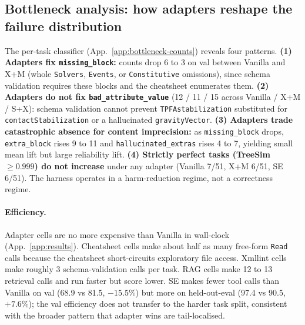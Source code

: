 \documentclass{article}
\begin{document}
\subsection{Bottleneck analysis: how adapters reshape the failure distribution}
\label{subsec:bottleneck-results}

The per-task classifier (App.~\ref{app:bottleneck-counts}) reveals four patterns. \textbf{(1) Adapters fix \texttt{missing\_block}:} counts drop 6 to 3 on val between Vanilla and X+M (whole \texttt{Solvers}, \texttt{Events}, or \texttt{Constitutive} omissions), since schema validation requires these blocks and the cheatsheet enumerates them. \textbf{(2) Adapters do not fix \texttt{bad\_attribute\_value}} (12 / 11 / 15 across Vanilla / X+M / S+X): schema validation cannot prevent \texttt{TPFAstabilization} substituted for \texttt{contactStabilization} or a hallucinated \texttt{gravityVector}. \textbf{(3) Adapters trade catastrophic absence for content imprecision:} as \texttt{missing\_block} drops, \texttt{extra\_block} rises 9 to 11 and \texttt{hallucinated\_extras} rises 4 to 7, yielding small mean lift but large reliability lift. \textbf{(4) Strictly perfect tasks (TreeSim $\geq 0.999$) do not increase} under any adapter (Vanilla 7/51, X+M 6/51, SE 6/51). The harness operates in a harm-reduction regime, not a correctness regime.

\paragraph{Efficiency.}\label{subsec:efficiency} Adapter cells are no more expensive than Vanilla in wall-clock (App.~\ref{app:results}). Cheatsheet cells make about half as many free-form \texttt{Read} calls because the cheatsheet short-circuits exploratory file access. Xmllint cells make roughly 3 schema-validation calls per task. RAG cells make 12 to 13 retrieval calls and run faster but score lower. SE makes fewer tool calls than Vanilla on val (68.9 vs 81.5, ${-}15.5\%$) but more on held-out-eval (97.4 vs 90.5, $+7.6\%$); the val efficiency does not transfer to the harder task split, consistent with the broader pattern that adapter wins are tail-localised.
\end{document}
